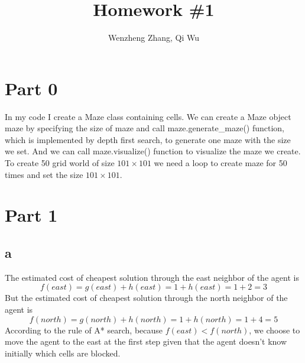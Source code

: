 \documentclass[11pt]{article}
\title{Homework \#1} %
\author{Wenzheng Zhang, Qi Wu} %
\begin{document}
\maketitle %

\section*{Part 0}
In my code I create a Maze class containing cells. We can create a Maze object maze by specifying the size of maze and call maze.generate\_maze() function,  which is implemented by depth first search, to generate one maze with the size we set. And we can call maze.visualize() function to visualize the maze we create. To create 50 grid world of size $101\times 101$ we need a loop to create maze for 50 times and  set the size $101\times 101$.



\section*{Part 1}





\subsection*{a}
 The estimated cost of cheapest solution through the east neighbor of the agent is
 $$f(east)=g(east)+h(east)=1+h(east)=1+2=3$$ 
 But the estimated cost of cheapest solution through the north neighbor of the agent is $$f(north)=g(north)+h(north)=1+h(north)=1+4=5$$ 
 According to the rule of A* search, because $f(east)<f(north)$, we choose to move the agent to  the east at the first step given that the agent doesn't know initially which cells are blocked.
\end{document}
